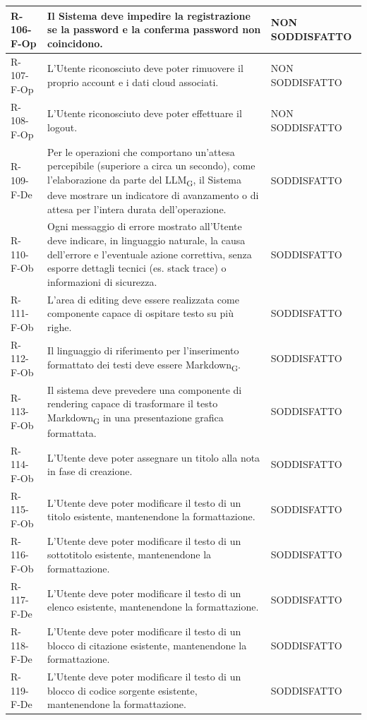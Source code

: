\documentclass[a4paper, 10pt]{article}
\begin{document}
\begin{longtable}{|p{2.1cm}|p{9.6cm}|p{2.6cm}|}
    R-106-F-Op & Il Sistema deve impedire la registrazione se la password e la conferma password non coincidono. & NON SODDISFATTO \\ \hline
    R-107-F-Op & L'Utente riconosciuto deve poter rimuovere il proprio account e i dati cloud associati. & NON SODDISFATTO \\ \hline
    R-108-F-Op & L'Utente riconosciuto deve poter effettuare il logout. & NON SODDISFATTO \\ \hline
    R-109-F-De & Per le operazioni che comportano un'attesa percepibile (superiore a circa un secondo), come l'elaborazione da parte del LLM\textsubscript{G}, il Sistema deve mostrare un indicatore di avanzamento o di attesa per l'intera durata dell'operazione. & SODDISFATTO \\ \hline
    R-110-F-Ob & Ogni messaggio di errore mostrato all'Utente deve indicare, in linguaggio naturale, la causa dell'errore e l'eventuale azione correttiva, senza esporre dettagli tecnici (es. stack trace) o informazioni di sicurezza. & SODDISFATTO \\ \hline
    R-111-F-Ob & L'area di editing deve essere realizzata come componente capace di ospitare testo su più righe. & SODDISFATTO \\ \hline
    R-112-F-Ob & Il linguaggio di riferimento per l'inserimento formattato dei testi deve essere Markdown\textsubscript{G}. & SODDISFATTO \\ \hline
    R-113-F-Ob & Il sistema deve prevedere una componente di rendering capace di trasformare il testo Markdown\textsubscript{G} in una presentazione grafica formattata. & SODDISFATTO \\ \hline
    R-114-F-Ob & L'Utente deve poter assegnare un titolo alla nota in fase di creazione. & SODDISFATTO \\ \hline
    R-115-F-Ob & L'Utente deve poter modificare il testo di un titolo esistente, mantenendone la formattazione. & SODDISFATTO \\ \hline
    R-116-F-Ob & L'Utente deve poter modificare il testo di un sottotitolo esistente, mantenendone la formattazione. & SODDISFATTO \\ \hline
    R-117-F-De & L'Utente deve poter modificare il testo di un elenco esistente, mantenendone la formattazione. & SODDISFATTO \\ \hline
    R-118-F-De & L'Utente deve poter modificare il testo di un blocco di citazione esistente, mantenendone la formattazione. & SODDISFATTO \\ \hline
    R-119-F-De & L'Utente deve poter modificare il testo di un blocco di codice sorgente esistente, mantenendone la formattazione. & SODDISFATTO \\ \hline

\end{longtable}
\end{document}
